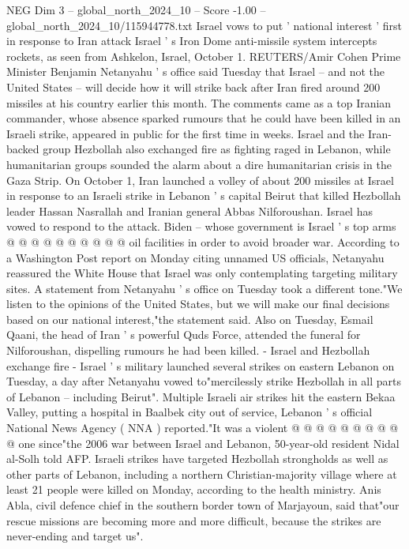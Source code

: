 \begin{textsample}{NEG Dim 3 – global\_north\_2024\_10 – Score -1.00 – global\_north\_2024\_10/115944778.txt}  \label{ex:f3_neg_304}
Israel vows to put ' national interest ' first in response to Iran attack Israel ' s Iron Dome anti-missile system intercepts rockets, as seen from Ashkelon, Israel, October 1.
REUTERS/Amir Cohen Prime Minister Benjamin Netanyahu ' s office said Tuesday that Israel -- and not the United States -- will decide how it will strike back after Iran fired around 200 missiles at his country earlier this month.
The comments came as a top Iranian commander, whose absence sparked rumours that he could have been killed in an Israeli strike, appeared in public for the first time in weeks.
Israel and the Iran-backed group Hezbollah also exchanged fire as fighting raged in Lebanon, while humanitarian groups sounded the alarm about a dire humanitarian crisis in the Gaza Strip.
On October 1, Iran launched a volley of about 200 missiles at Israel in response to an Israeli strike in Lebanon ' s capital Beirut that killed Hezbollah leader Hassan Nasrallah and Iranian general Abbas Nilforoushan.
Israel has vowed to respond to the attack.
Biden -- whose government is Israel ' s top arms @ @ @ @ @ @ @ @ @ @ oil facilities in order to avoid broader war.
According to a Washington Post report on Monday citing unnamed US officials, Netanyahu reassured the White House that Israel was only contemplating targeting military sites.
A statement from Netanyahu ' s office on Tuesday took a different tone."We listen to the opinions of the United States, but we will make our final decisions based on our national interest,"the statement said.
Also on Tuesday, Esmail Qaani, the head of Iran ' s powerful Quds Force, attended the funeral for Nilforoushan, dispelling rumours he had been killed. - Israel and Hezbollah exchange fire - Israel ' s military launched several strikes on eastern Lebanon on Tuesday, a day after Netanyahu vowed to"mercilessly strike Hezbollah in all parts of Lebanon -- including Beirut".
Multiple Israeli air strikes hit the eastern Bekaa Valley, putting a hospital in Baalbek city out of service, Lebanon ' s official National News Agency ( NNA ) reported."It was a violent @ @ @ @ @ @ @ @ @ @ one since"the 2006 war between Israel and Lebanon, 50-year-old resident Nidal al-Solh told AFP.
Israeli strikes have targeted Hezbollah strongholds as well as other parts of Lebanon, including a northern Christian-majority village where at least 21 people were killed on Monday, according to the health ministry.
Anis Abla, civil defence chief in the southern border town of Marjayoun, said that"our rescue missions are becoming more and more difficult, because the strikes are never-ending and target us".

\end{textsample}
